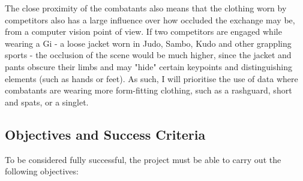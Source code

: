 \documentclass[a4paper, oneside, 11pt]{article}
\begin{document}
\bigskip
\noindent
The close proximity of the combatants also means that the clothing worn by competitors also has a large influence over how occluded the exchange may be, from a computer vision point of view. If two competitors are engaged while wearing a Gi - a loose jacket worn in Judo, Sambo, Kudo and other grappling sports - the occlusion of the scene would be much higher, since the jacket and pants obscure their limbs and may "hide" certain keypoints and distinguishing elements (such as hands or feet). As such, I will prioritise the use of data where combatants are wearing more form-fitting clothing, such as a rashguard, short and spats, or a singlet. 

\subsection{Objectives and Success Criteria}

To be considered fully successful, the project must be able to carry out the following objectives:
\end{document}
